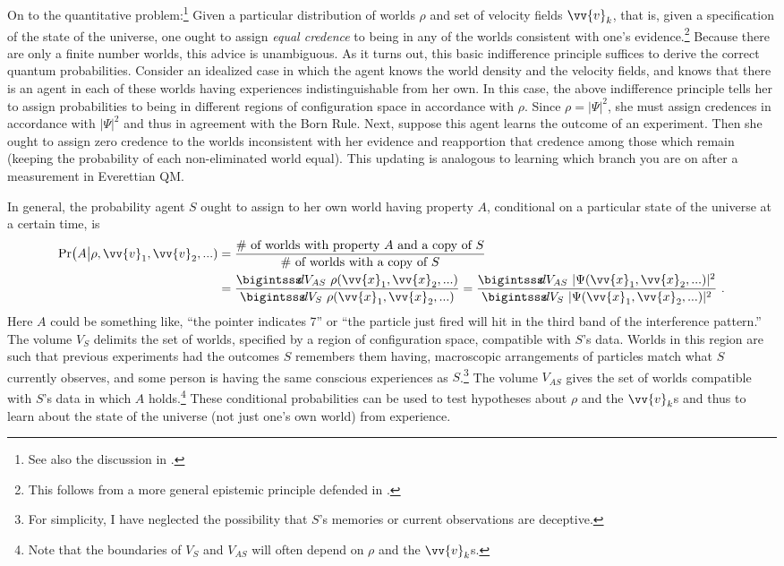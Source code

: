 \documentclass[onecolumn,secnumarabic,balancelastpage,amsmath,amssymb,nofootinbib]{article}
\begin{document}
On to the quantitative problem:\footnote{See also the discussion in \citet[]{bostrom2012}.} Given a particular distribution of worlds $\rho$ and set of velocity fields $\vv{v}_k$, that is, given a specification of the state of the universe, one ought to assign \emph{equal credence} to being in any of the worlds consistent with one's evidence.\footnote{This follows from a more general epistemic principle defended in \citet{elga2004}.}  Because there are only a finite number worlds, this advice is unambiguous.  As it turns out, this basic indifference principle suffices to derive the correct quantum probabilities.  Consider an idealized case in which the agent knows the world density and the velocity fields, and knows that there is an agent in each of these worlds having experiences indistinguishable from her own.  In this case, the above indifference principle tells her to assign probabilities to being in different regions of configuration space in accordance with $\rho$.  Since $\rho=|\Psi|^2$, she must assign credences in accordance with $|\Psi|^2$ and thus in agreement with the Born Rule.  Next, suppose this agent learns the outcome of an experiment.  Then she ought to assign zero credence to the worlds inconsistent with her evidence and reapportion that credence among those which remain (keeping the probability of each non-eliminated world equal).  This updating is analogous to learning which branch you are on after a measurement in Everettian QM.

In general, the probability agent $S$ ought to assign to her own world having property $A$, conditional on a particular state of the universe at a certain time, is
\begin{align}
\mbox{Pr}\big(A\big|\rho,\vv{v}_1, \vv{v}_2, ...)&=\frac{\mbox{\# of worlds with property }A\mbox{ and a copy of }S}{\mbox{\# of worlds with a copy of }S}
\nonumber
\\
&=\frac{\bigintsss\!\! d V_{AS} \ \rho(\vv{x}_1,\vv{x}_2,...)}{\bigintsss\!\! d V_S \ \rho(\vv{x}_1,\vv{x}_2,...)}=\frac{\bigintsss\!\! d V_{AS} \ |\Psi(\vv{x}_1,\vv{x}_2,...)|^2}{\bigintsss\!\! d V_S \ |\Psi(\vv{x}_1,\vv{x}_2,...)|^2}\ .
\end{align}
Here $A$ could be something like, ``the pointer indicates 7'' or ``the particle just fired will hit in the third band of the interference pattern.''  The volume $V_{S}$ delimits the set of worlds, specified by a region of configuration space, compatible with $S$'s data.  Worlds in this region are such that previous experiments had the outcomes $S$ remembers them having, macroscopic arrangements of particles match what $S$ currently observes, and some person is having the same conscious experiences as $S$.\footnote{For simplicity, I have neglected the possibility that $S$'s memories or current observations are deceptive.}  The volume $V_{AS}$ gives the set of worlds compatible with $S$'s data in which $A$ holds.\footnote{Note that the boundaries of $V_{S}$ and $V_{AS}$ will often depend on $\rho$ and the $\vv{v}_k$s.}  These conditional probabilities can be used to test hypotheses about $\rho$ and the $\vv{v}_k$s and thus to learn about the state of the universe (not just one's own world) from experience.
\end{document}
